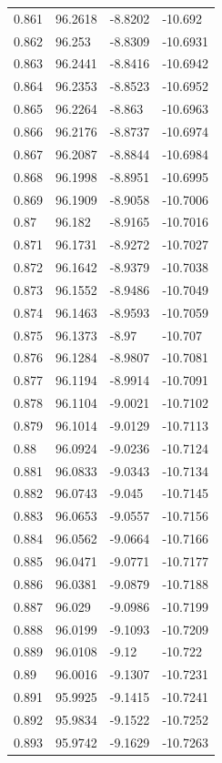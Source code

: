\begin{tabular}{llll}
0.861 & 96.2618 & -8.8202 & -10.692 \\
0.862 & 96.253 & -8.8309 & -10.6931 \\
0.863 & 96.2441 & -8.8416 & -10.6942 \\
0.864 & 96.2353 & -8.8523 & -10.6952 \\
0.865 & 96.2264 & -8.863 & -10.6963 \\
0.866 & 96.2176 & -8.8737 & -10.6974 \\
0.867 & 96.2087 & -8.8844 & -10.6984 \\
0.868 & 96.1998 & -8.8951 & -10.6995 \\
0.869 & 96.1909 & -8.9058 & -10.7006 \\
0.87 & 96.182 & -8.9165 & -10.7016 \\
0.871 & 96.1731 & -8.9272 & -10.7027 \\
0.872 & 96.1642 & -8.9379 & -10.7038 \\
0.873 & 96.1552 & -8.9486 & -10.7049 \\
0.874 & 96.1463 & -8.9593 & -10.7059 \\
0.875 & 96.1373 & -8.97 & -10.707 \\
0.876 & 96.1284 & -8.9807 & -10.7081 \\
0.877 & 96.1194 & -8.9914 & -10.7091 \\
0.878 & 96.1104 & -9.0021 & -10.7102 \\
0.879 & 96.1014 & -9.0129 & -10.7113 \\
0.88 & 96.0924 & -9.0236 & -10.7124 \\
0.881 & 96.0833 & -9.0343 & -10.7134 \\
0.882 & 96.0743 & -9.045 & -10.7145 \\
0.883 & 96.0653 & -9.0557 & -10.7156 \\
0.884 & 96.0562 & -9.0664 & -10.7166 \\
0.885 & 96.0471 & -9.0771 & -10.7177 \\
0.886 & 96.0381 & -9.0879 & -10.7188 \\
0.887 & 96.029 & -9.0986 & -10.7199 \\
0.888 & 96.0199 & -9.1093 & -10.7209 \\
0.889 & 96.0108 & -9.12 & -10.722 \\
0.89 & 96.0016 & -9.1307 & -10.7231 \\
0.891 & 95.9925 & -9.1415 & -10.7241 \\
0.892 & 95.9834 & -9.1522 & -10.7252 \\
0.893 & 95.9742 & -9.1629 & -10.7263 \\

\end{tabular}
